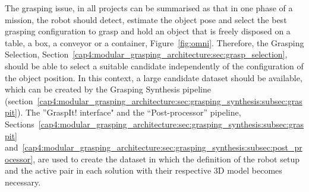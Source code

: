 The grasping issue, in all projects can be summarised as that in one phase of a mission, the robot should detect, estimate the object pose and select the best grasping configuration to grasp and hold an object that is freely disposed on a table, a box, a conveyor or a container, Figure~\ref{fig:omni}. Therefore, the Grasping Selection, Section~\ref{cap4:modular_grasping_architecture:sec:grasp_selection}, should be able to select a suitable candidate independently of the configuration of the object position. In this context, a large candidate dataset should be available, which can be created by the Grasping Synthesis pipeline (section~\ref{cap4:modular_grasping_architecture:sec:grasping_synthesis:subsec:graspit}). The ''GraspIt! interface" and the ``Post-processor'' pipeline, Sections~\ref{cap4:modular_grasping_architecture:sec:grasping_synthesis:subsec:graspit} and~\ref{cap4:modular_grasping_architecture:sec:grasping_synthesis:subsec:post_processor}, are used to create the dataset in which the definition of the robot setup and the active pair in each solution with their respective 3D model becomes necessary.

\begin{figure}[h!]
\end{figure}


